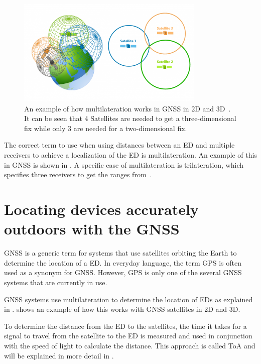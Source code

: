 \begin{figure}[htbp]
    \centering
    \includegraphics[width=0.8\textwidth]{pictures/multilateration/gps_multilateration.png}
    \caption[Example of how multilateration works in the \acl{GNSS} in 2D and 3D]{
        An example of how multilateration works in \ac{GNSS} in 2D and 3D~\protect\cite{gisgeography_how_2018}.
        It can be seen that 4 Satellites are needed to get a three-dimensional fix while only 3 are needed for a two-dimensional fix.
    }\label{pic:multilateration-gps-2d-3d-example}
\end{figure}

The correct term to use when using distances between an \acl{ED} and multiple receivers to achieve a localization of the \acl{ED} is multilateration.
An example of this in \ac{GNSS} is shown in .
A specific case of multilateration is trilateration, which specifies three receivers to get the ranges from~\cite{ruiz_efficient_2013}.

\section{Locating devices accurately outdoors with the \acl{GNSS}}

\ac{GNSS} is a generic term for systems that use satellites orbiting the Earth to determine the location of a \acl{ED}.
In everyday language, the term \ac{GPS} is often used as a synonym for \ac{GNSS}.
However, \ac{GPS} is only one of the several \ac{GNSS} systems that are currently in use.

\ac{GNSS} systems use multilateration to determine the location of \aclp{ED} as explained in .
 shows an example of how this works with \ac{GNSS} satellites in 2D and 3D.

To determine the distance from the \acl{ED} to the satellites, the time it takes for a signal to travel from the satellite to the \acl{ED} is measured and used in conjunction with the speed of light to calculate the distance.
This approach is called \acf{ToA} and will be explained in more detail in .

